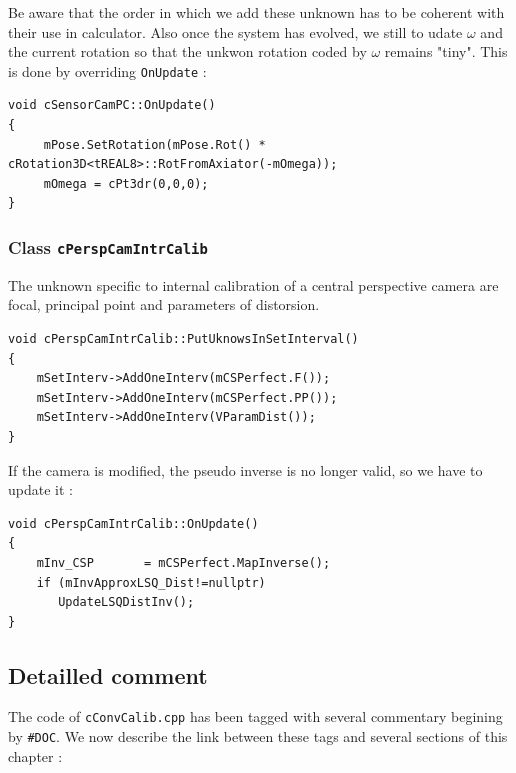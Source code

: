 Be aware that the order in which we add these unknown has to be coherent with their use in calculator.
Also once the system has evolved, we still to udate $\omega$  and the current rotation
so that the unkwon rotation coded by $\omega$  remains "tiny". This is done  by
overriding {\tt OnUpdate} :


\begin{lstlisting}
void cSensorCamPC::OnUpdate()
{
     mPose.SetRotation(mPose.Rot() * cRotation3D<tREAL8>::RotFromAxiator(-mOmega));
     mOmega = cPt3dr(0,0,0);
}
\end{lstlisting}

\subsubsection{Class {\tt cPerspCamIntrCalib}}

The unknown specific to internal calibration of a central perspective camera are focal, principal 
point and parameters of distorsion. 


\begin{lstlisting}
void cPerspCamIntrCalib::PutUknowsInSetInterval()
{
    mSetInterv->AddOneInterv(mCSPerfect.F());
    mSetInterv->AddOneInterv(mCSPerfect.PP());
    mSetInterv->AddOneInterv(VParamDist());
}
\end{lstlisting}

If the camera is modified, the pseudo inverse is no longer valid, so we have to update it :

\begin{lstlisting}
void cPerspCamIntrCalib::OnUpdate()
{
    mInv_CSP       = mCSPerfect.MapInverse();
    if (mInvApproxLSQ_Dist!=nullptr)
       UpdateLSQDistInv();
}
\end{lstlisting}

\subsection{Detailled comment}

The code of {\tt cConvCalib.cpp} has been tagged with several commentary begining by {\tt \#DOC}.
We now describe the link between these tags and several sections of this chapter :

